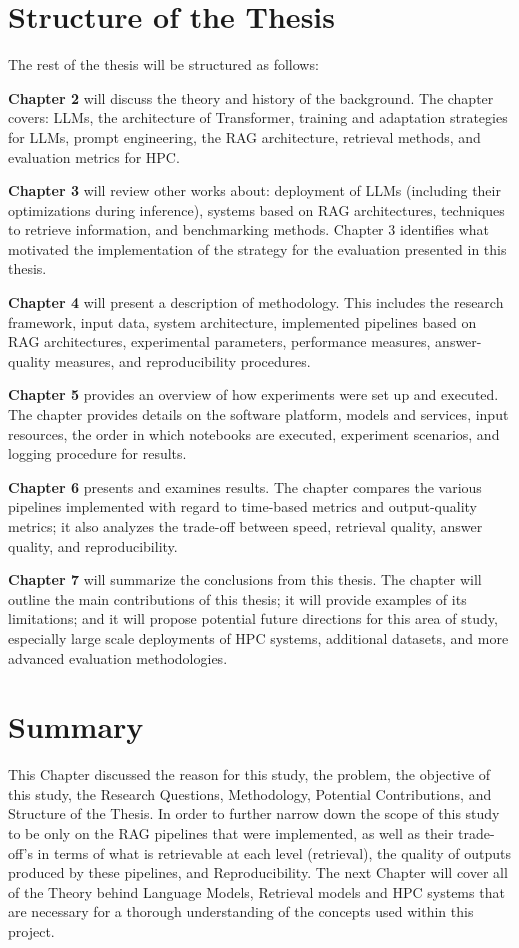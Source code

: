 \section{Structure of the Thesis}

The rest of the thesis will be structured as follows:

\textbf{Chapter 2 }will discuss the theory and history of the background. The chapter covers:
\acp{LLM}, the architecture of Transformer, training and adaptation strategies for \acp{LLM}, prompt engineering, the \ac{RAG} architecture, retrieval methods, and evaluation metrics for \ac{HPC}.

\textbf{Chapter 3} will review other works about:
deployment of \acp{LLM} (including their optimizations during inference), systems based on \ac{RAG} architectures, techniques to retrieve information, and benchmarking methods. Chapter 3 identifies what motivated the implementation of the strategy for the evaluation presented in this thesis.

\textbf{Chapter 4} will present a description of methodology. This includes the research framework, input data, system architecture, implemented pipelines based on \ac{RAG} architectures, experimental parameters, performance measures, answer-quality measures, and reproducibility procedures.

\textbf{Chapter 5} provides an overview of how experiments were set up and executed. The chapter provides details on the software platform, models and services, input resources, the order in which notebooks are executed, experiment scenarios, and logging procedure for results.

\textbf{Chapter 6} presents and examines results. The chapter compares the various pipelines implemented with regard to time-based metrics and output-quality metrics; it also analyzes the trade-off between speed, retrieval quality, answer quality, and reproducibility.

\textbf{Chapter 7} will summarize the conclusions from this thesis. The chapter will outline the main contributions of this thesis; it will provide examples of its limitations; and it will propose potential future directions for this area of study, especially large scale deployments of HPC systems, additional datasets, and more advanced evaluation methodologies.

\section{Summary}

This Chapter discussed the reason for this study, the problem, the objective of this study, the Research Questions, Methodology, Potential Contributions, and Structure of the Thesis. In order to further narrow down the scope of this study to be only on the \ac{RAG} pipelines that were implemented, as well as their trade-off's in terms of what is retrievable at each level (retrieval), the quality of outputs produced by these pipelines, and Reproducibility. The next Chapter will cover all of the Theory behind Language Models, Retrieval models and \ac{HPC} systems that are necessary for a thorough understanding of the concepts used within this project.
